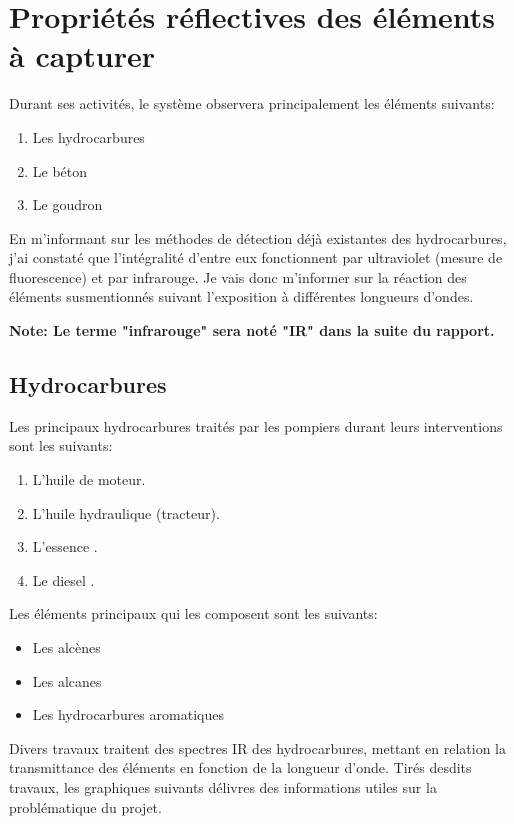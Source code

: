 \section{Propriétés réflectives des éléments à capturer}
Durant ses activités, le système observera principalement les éléments suivants:
\begin{enumerate}
    \item Les hydrocarbures
    \item Le béton
    \item Le goudron
\end{enumerate}
En m'informant sur les méthodes de détection déjà existantes des hydrocarbures, j'ai constaté que l'intégralité d'entre eux fonctionnent
par ultraviolet (mesure de fluorescence) et par infrarouge. Je vais donc m'informer sur la réaction des éléments susmentionnés suivant l'exposition à différentes longueurs d'ondes.

\textbf{Note: Le terme "infrarouge" sera noté "IR" dans la suite du rapport.}
\subsection{Hydrocarbures}
Les principaux hydrocarbures traités par les pompiers durant leurs interventions sont les suivants:
\begin{enumerate}
    \item L'huile de moteur.
    \item L'huile hydraulique (tracteur).
    \item L'essence \cite{TotalEnergies}.
    \item Le diesel \cite{TotalEnergies}.
\end{enumerate}
Les éléments principaux qui les composent sont les suivants:
\begin{itemize}
    \item Les alcènes
    \item Les alcanes
    \item Les hydrocarbures aromatiques
\end{itemize}
Divers travaux \cite{Hydrocarbures} traitent des spectres IR des hydrocarbures, mettant en relation la transmittance des éléments en fonction de la longueur d'onde.
Tirés desdits travaux, les graphiques suivants délivres des informations utiles sur la problématique du projet.

